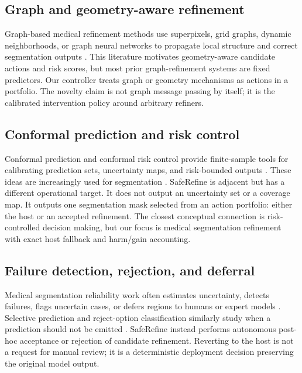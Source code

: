 \documentclass[preprint,12pt]{elsarticle}
\begin{document}
\subsection{Graph and geometry-aware refinement}

Graph-based medical refinement methods use superpixels, grid graphs, dynamic
neighborhoods, or graph neural networks to propagate local structure and
correct segmentation outputs
\cite{soberanis2020uncertainty,demir2021dynamicgraph}. This literature
motivates geometry-aware candidate actions and risk scores, but most prior
graph-refinement systems are fixed predictors. Our controller treats graph or
geometry mechanisms as actions in a portfolio. The novelty claim is not graph
message passing by itself; it is the calibrated intervention policy around
arbitrary refiners.

\subsection{Conformal prediction and risk control}

Conformal prediction and conformal risk control provide finite-sample tools for
calibrating prediction sets, uncertainty maps, and risk-bounded outputs
\cite{vovk2005algorithmic,angelopoulos2021gentle,romano2019conformal,bates2021distributionfree,angelopoulos2024crc}.
These ideas are increasingly used for segmentation
\cite{mossina2024conformal,morphological2025conformal}.
SafeRefine is adjacent but has a different operational target. It does not
output an uncertainty set or a coverage map. It outputs one segmentation mask
selected from an action portfolio: either the host or an accepted refinement.
The closest conceptual connection is risk-controlled decision making, but our
focus is medical segmentation refinement with exact host fallback and harm/gain
accounting.

\subsection{Failure detection, rejection, and deferral}

Medical segmentation reliability work often estimates uncertainty, detects
failures, flags uncertain cases, or defers regions to humans or expert models
\cite{gal2016dropout,kendall2017uncertainties,baumgartner2019phiseg,roy2019quicknat,mehrtash2020confidence,jungo2020analyzing,deferredseg2026}.
Selective prediction and reject-option classification similarly study when a
prediction should not be emitted
\cite{chow1970optimum,elyaniv2010foundations,geifman2017selective}.
SafeRefine instead performs autonomous post-hoc acceptance or rejection of
candidate refinement. Reverting to the host is not a request for manual review;
it is a deterministic deployment decision preserving the original model output.
\end{document}
